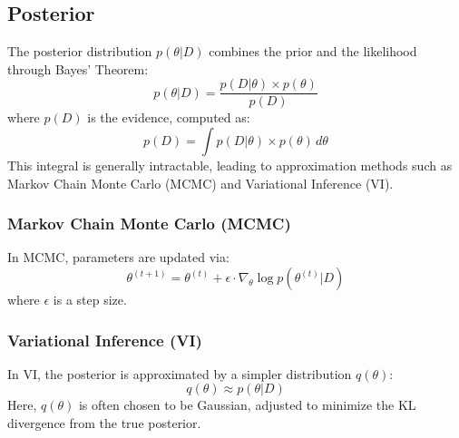 \documentclass{article}
\begin{document}
\subsection{Posterior}
The posterior distribution \( p(\theta|D) \) combines the prior and the likelihood through Bayes' Theorem:
\[
p(\theta|D) = \frac{p(D|\theta) \times p(\theta)}{p(D)}
\]
where \( p(D) \) is the evidence, computed as:
\[
p(D) = \int p(D|\theta) \times p(\theta) \, d\theta
\]
This integral is generally intractable, leading to approximation methods such as Markov Chain Monte Carlo (MCMC) and Variational Inference (VI).

\subsubsection{Markov Chain Monte Carlo (MCMC)}
In MCMC, parameters are updated via:
\[
\theta^{(t+1)} = \theta^{(t)} + \epsilon \cdot \nabla_{\theta} \log p(\theta^{(t)}|D)
\]
where \( \epsilon \) is a step size.

\subsubsection{Variational Inference (VI)}
In VI, the posterior is approximated by a simpler distribution \( q(\theta) \):
\[
q(\theta) \approx p(\theta|D)
\]
Here, \( q(\theta) \) is often chosen to be Gaussian, adjusted to minimize the KL divergence from the true posterior.
\end{document}
